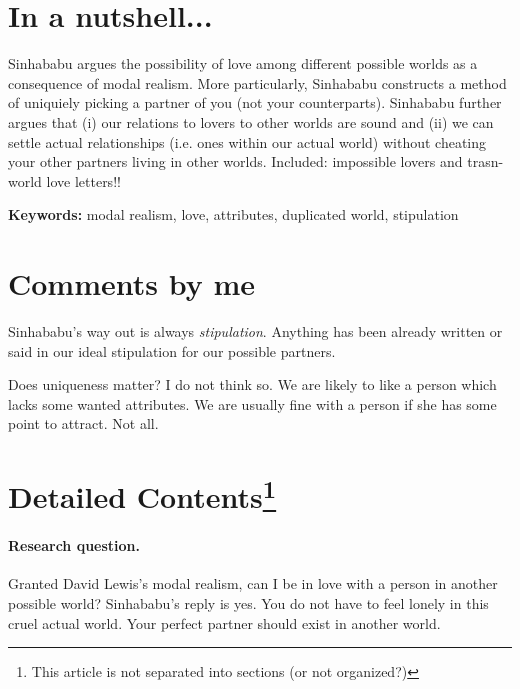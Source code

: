 \documentclass[
10pt, %
a4paper, %
twocolumn, %
landscape %
]{article}
\begin{document}
\pagestyle{myheadings} %
\markright{\doctitle} %


\thispagestyle{plain} %

\printtitle %


\section*{In a nutshell... }
Sinhababu argues the possibility of love among different possible worlds as a consequence of modal realism.
More particularly, Sinhababu constructs a method of uniquiely picking a partner of you (not your counterparts).
Sinhababu further argues that (i) our relations to lovers to other worlds are sound and (ii) we can settle actual relationships (i.e. ones within our actual world) without cheating your other partners living in other worlds.
Included: impossible lovers and trasn-world love letters!!

\noindent \textbf{Keywords:} modal realism, love, attributes, duplicated world, stipulation

\section*{Comments by me}
Sinhababu's way out is always \emph{stipulation}.
Anything has been already written or said in our ideal stipulation for our possible partners.

Does uniqueness matter? I do not think so. We are likely to like a person which lacks some wanted attributes. We are usually fine with a person if she has some point to attract. Not all.

\section*{Detailed Contents\footnote{This article is not separated into sections (or not organized?)}}

\paragraph{Research question.}
Granted David Lewis's modal realism, can I be in love with a person in another possible world? Sinhababu's reply is yes. You do not have to feel lonely in this cruel actual world. Your perfect partner should exist in another world.
\end{document}
